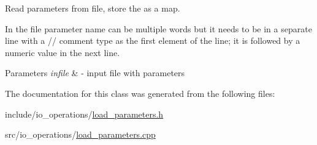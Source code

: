 Read parameters from file, store the as a map. 

In the file parameter name can be multiple words but it needs to be in a separate line with a // comment type as the first element of the line; it is followed by a numeric value in the next line.


\begin{DoxyParams}{Parameters}
{\em infile} & -\/ input file with parameters \\
\hline
\end{DoxyParams}


The documentation for this class was generated from the following files\+:\begin{DoxyCompactItemize}
\item 
include/io\+\_\+operations/\hyperlink{load__parameters_8h}{load\+\_\+parameters.\+h}\item 
src/io\+\_\+operations/\hyperlink{load__parameters_8cpp}{load\+\_\+parameters.\+cpp}\end{DoxyCompactItemize}
